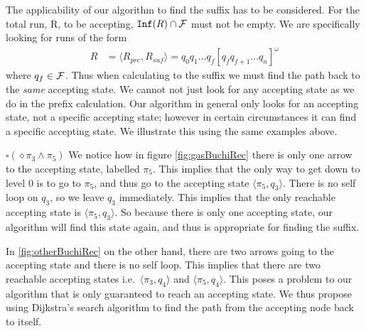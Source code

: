 The applicability of our algorithm to find the suffix has to be considered. For the total run, R, to be accepting, $\texttt{Inf}(R) \cap \mathcal{F}$ must not be empty. We are specifically looking for runs of the form 
\begin{align*}
R &= \langle R_{pre}, R_{suf} \rangle = q_0 q_1 \dots q_f [q_f q_{f+1} \dots q_n]^\omega
\end{align*}     
where $q_f \in \mathcal{F}$. Thus when calculating to the suffix we must find the path back to the \textit{same} accepting state. We cannot not just look for any accepting state as we do in the prefix calculation. Our algorithm in general only looks for an accepting state, not a specific accepting state; however in certain circumstances it can find a specific accepting state. We illustrate this using the same examples above. 

$\square (\diamond \pi_3 \wedge \pi_5)$ 
We notice how in figure \ref{fig:gasBuchiRec} there is only one arrow to the accepting state, labelled $\pi_5$. This implies that the only way to get down to level 0 is to go to $\pi_5$, and thus go to the accepting state $\langle \pi_5, q_3 \rangle$. There is no self loop on $q_3$, so we leave $q_3$ immediately. This implies that the only reachable accepting state is $\langle \pi_5, q_3 \rangle$. So because there is only one accepting state, our algorithm will find this state again, and thus is appropriate for finding the suffix. 

In \ref{fig:otherBuchiRec} on the other hand, there are two arrows going to the accepting state and there is no self loop. This implies that there are two reachable accepting states i.e.\ $\langle \pi_3, q_4 \rangle$ and $\langle \pi_5, q_4 \rangle$. This poses a problem to our algorithm that is only guaranteed to reach an accepting state. We thus propose using Dijkstra's search algorithm to find the path from the accepting node back to itself.   

